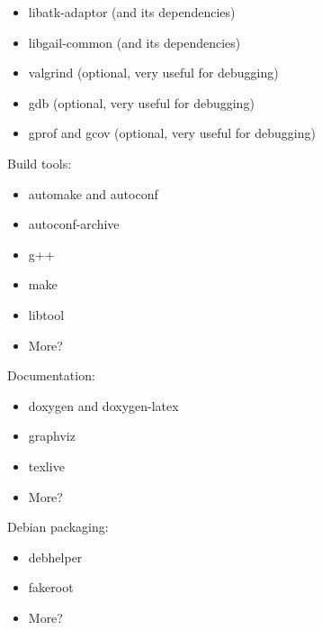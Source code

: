      \begin{itemize}
        \item libatk-adaptor (and its dependencies)
        \item libgail-common (and its dependencies)
        \item valgrind (optional, very useful for debugging)
        \item gdb (optional, very useful for debugging)
        \item gprof and gcov (optional, very useful for debugging)
     \end{itemize}

   Build tools:

     \begin{itemize}
        \item automake and autoconf
        \item autoconf-archive
        \item g++
        \item make
        \item libtool
        \item More?
     \end{itemize}

   Documentation:

     \begin{itemize}
        \item doxygen and doxygen-latex
        \item graphviz
        \item texlive
        \item More?
     \end{itemize}
      
   Debian packaging:

     \begin{itemize}
        \item debhelper
        \item fakeroot
        \item More?
     \end{itemize}

